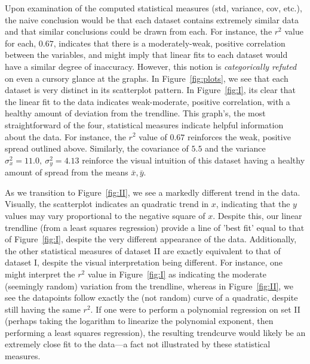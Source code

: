 \documentclass[11pt,a4paper]{article}
\begin{document}
Upon examination of the computed statistical measures (std, variance, cov, etc.), the naive conclusion would be that each dataset contains extremely similar data and that similar conclusions could be drawn from each. For instance, the $r^2$ value for each, $0.67$, indicates that there is a moderately-weak, positive correlation between the variables, and might imply that linear fits to each dataset would have a similar degree of inaccuracy. However, this notion is \textit{categorically refuted} on even a cursory glance at the graphs. In Figure~\ref{fig:plots}, we see that each dataset is very distinct in its scatterplot pattern. In Figure~\ref{fig:I}, its clear that the linear fit to the data indicates weak-moderate, positive correlation, with a healthy amount of deviation from the trendline. This graph's, the most straightforward of the four, statistical measures indicate helpful information about the data. For instance, the $r^2$ value of $0.67$ reinforces the weak, positive spread outlined above. Similarly, the covariance of $5.5$ and the variance $\sigma_x^2 = 11.0,\ \sigma_y^2 = 4.13$ reinforce the visual intuition of this dataset having a healthy amount of spread from the means $\bar{x}, \bar{y}$. 

	As we transition to Figure~\ref{fig:II}, we see a markedly different trend in the data. 
Visually, the scatterplot indicates an quadratic trend in $x$, indicating that the $y$ values may vary proportional to the negative square of $x$. 
Despite this, our linear trendline (from a least squares regression) provide a line of 'best fit' equal to that of Figure~\ref{fig:I}, despite the very different appearance of the data. 
Additionally, the other statistical measures of dataset II are exactly equivalent to that of dataset I, despite the visual interpretation being different. For instance, one might interpret the $r^2$ value in Figure~\ref{fig:I} as indicating the moderate (seemingly random) variation from the trendline, whereas in Figure~\ref{fig:II}, we see the datapoints follow exactly the (not random) curve of a quadratic, despite still having the same $r^2$. 
If one were to perform a polynomial regression on set II (perhaps taking the logarithm to linearize the polynomial exponent, then performing a least squares regression), the resulting trendcurve would likely be an extremely close fit to the data---a fact not illustrated by these statistical measures. 
\end{document}
